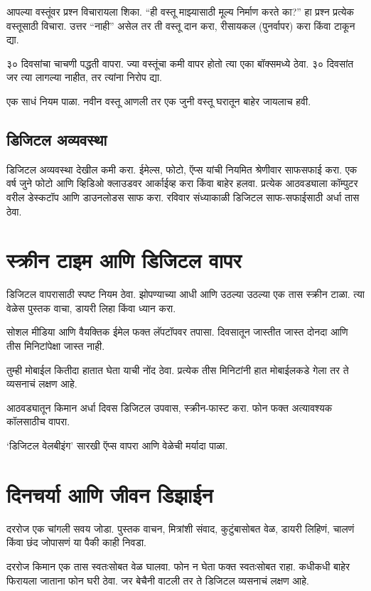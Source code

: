 आपल्या वस्तूंवर प्रश्न विचारायला शिका. “ही वस्तू माझ्यासाठी मूल्य निर्माण करते का?” हा प्रश्न प्रत्येक वस्तूसाठी विचारा. उत्तर “नाही” असेल तर ती वस्तू दान करा, रीसायकल (पुनर्वापर) करा किंवा टाकून द्या.

३० दिवसांचा चाचणी पद्धती वापरा. ज्या वस्तूंचा कमी वापर होतो त्या एका बॉक्समध्ये ठेवा. ३० दिवसांत जर त्या लागल्या नाहीत, तर त्यांना निरोप द्या.

एक साधं नियम पाळा. नवीन वस्तू आणली तर एक जुनी वस्तू घरातून बाहेर जायलाच हवी.

\subsection*{ डिजिटल अव्यवस्था}

डिजिटल अव्यवस्था देखील कमी करा. ईमेल्स, फोटो, ऍप्स यांची नियमित श्रेणीवार साफसफाई करा. एक वर्ष जुने फोटो आणि व्हिडिओ क्लाउडवर आर्काईव्ह करा किंवा बाहेर हलवा. प्रत्येक आठवड्याला कॉम्पुटर वरील डेस्कटॉप आणि डाउनलोडस साफ करा. रविवार संध्याकाळी डिजिटल साफ-सफाईसाठी अर्धा तास ठेवा.

\section*{स्क्रीन टाइम आणि डिजिटल वापर}

डिजिटल वापरासाठी स्पष्ट नियम ठेवा. झोपण्याच्या आधी आणि उठल्या उठल्या एक तास स्क्रीन टाळा. त्या वेळेस पुस्तक वाचा, डायरी लिहा किंवा ध्यान करा.

सोशल मीडिया आणि वैयक्तिक ईमेल फक्त लॅपटॉपवर तपासा. दिवसातून जास्तीत जास्त दोनदा आणि तीस मिनिटांपेक्षा जास्त नाही.

तुम्ही मोबाईल कितीदा हातात घेता याची नोंद ठेवा. प्रत्येक तीस मिनिटांनी हात मोबाईलकडे गेला तर ते व्यसनाचं लक्षण आहे.

आठवड्यातून किमान अर्धा दिवस डिजिटल उपवास, स्क्रीन-फास्ट करा. फोन फक्त अत्यावश्यक कॉलसाठीच वापरा.

‘डिजिटल वेलबीइंग’ सारखी ऍप्स वापरा आणि वेळेची मर्यादा पाळा.

\section*{दिनचर्या आणि जीवन डिझाईन}

दररोज एक चांगली सवय जोडा. पुस्तक वाचन, मित्रांशी संवाद, कुटुंबासोबत वेळ, डायरी लिहिणं, चालणं किंवा छंद जोपासणं या पैकी काही निवडा.

दररोज किमान एक तास स्वतःसोबत वेळ घालवा. फोन न घेता फक्त स्वतःसोबत राहा. कधीकधी बाहेर फिरायला जाताना फोन घरी ठेवा. जर बेचैनी वाटली तर ते डिजिटल व्यसनाचं लक्षण आहे.

